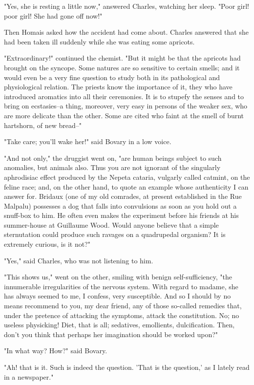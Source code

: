 \documentclass[11pt,twocolumn]{ltugboat}
\begin{document}
"Yes, she is resting a little now," answered Charles, watching her
sleep. "Poor girl! poor girl! She had gone off now!"

Then Homais asked how the accident had come about. Charles answered that
she had been taken ill suddenly while she was eating some apricots.

"Extraordinary!" continued the chemist. "But it might be that the
apricots had brought on the syncope. Some natures are so sensitive to
certain smells; and it would even be a very fine question to study both
in its pathological and physiological relation. The priests know the
importance of it, they who have introduced aromatics into all their
ceremonies. It is to stupefy the senses and to bring on ecstasies--a
thing, moreover, very easy in persons of the weaker sex, who are more
delicate than the other. Some are cited who faint at the smell of burnt
hartshorn, of new bread--"

"Take care; you'll wake her!" said Bovary in a low voice.

"And not only," the druggist went on, "are human beings subject to such
anomalies, but animals also. Thus you are not ignorant of the singularly
aphrodisiac effect produced by the Nepeta cataria, vulgarly called
catmint, on the feline race; and, on the other hand, to quote an example
whose authenticity I can answer for. Bridaux (one of my old comrades, at
present established in the Rue Malpalu) possesses a dog that falls into
convulsions as soon as you hold out a snuff-box to him. He often even
makes the experiment before his friends at his summer-house at Guillaume
Wood. Would anyone believe that a simple sternutation could produce such
ravages on a quadrupedal organism? It is extremely curious, is it not?"

"Yes," said Charles, who was not listening to him.

"This shows us," went on the other, smiling with benign
self-sufficiency, "the innumerable irregularities of the nervous system.
With regard to madame, she has always seemed to me, I confess, very
susceptible. And so I should by no means recommend to you, my dear
friend, any of those so-called remedies that, under the pretence
of attacking the symptoms, attack the constitution. No; no useless
physicking! Diet, that is all; sedatives, emollients, dulcification.
Then, don't you think that perhaps her imagination should be worked
upon?"

"In what way? How?" said Bovary.

"Ah! that is it. Such is indeed the question. 'That is the question,' as
I lately read in a newspaper."
\end{document}
